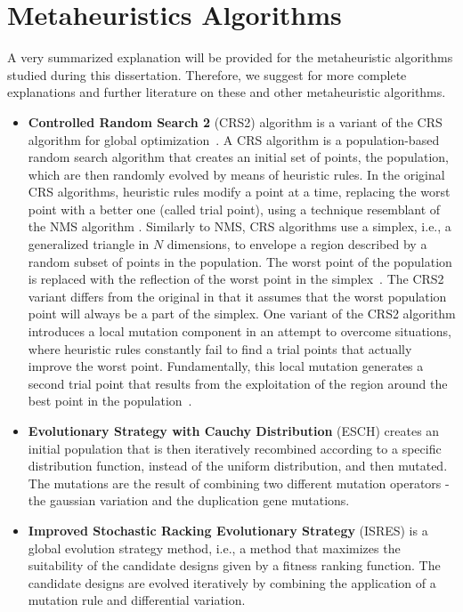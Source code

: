 \section{Metaheuristics Algorithms}

A very summarized explanation will be provided for the metaheuristic algorithms studied during this dissertation. Therefore, we suggest \cite{BlumRoli2003Metaheuristics,Glover2003Metaheuristics} for more complete explanations and further literature on these and other metaheuristic algorithms.

\begin{itemize}
	\item \textbf{Controlled Random Search 2} (CRS2) algorithm is a variant of the CRS algorithm for global optimization~\cite{Price1983}. A CRS algorithm is a population-based random search algorithm that creates an initial set of points, the population, which are then randomly evolved by means of heuristic rules. In the original CRS algorithms, heuristic rules modify a point at a time, replacing the worst point with a better one (called trial point), using a technique resemblant of the NMS algorithm \cite{Nelder1964}. Similarly to NMS, CRS algorithms use a simplex, i.e., a generalized triangle in $N$ dimensions, to envelope a region described by a random subset of points in the population. The worst point of the population is replaced with the reflection of the worst point in the simplex~\cite{Kaelo2006CRS2}. The CRS2 variant differs from the original in that it assumes that the worst population point will always be a part of the simplex. One variant of the CRS2 algorithm introduces a local mutation component in an attempt to overcome situations,  where heuristic rules constantly fail to find a trial points that actually improve the worst point. Fundamentally, this local mutation generates a second trial point that results from the exploitation of the region around the best point in the population~\cite{Kaelo2006CRS2}.  
	
	\item \textbf{Evolutionary Strategy with Cauchy Distribution} (ESCH)  creates an initial population that is then iteratively recombined according to a specific distribution function, instead of the uniform distribution, and then mutated. The mutations are the result of combining two different mutation operators - the gaussian variation and the duplication gene mutations.
	
	\item \textbf{Improved Stochastic Racking Evolutionary Strategy} (ISRES)  is a global evolution strategy method, i.e., a method that maximizes the suitability of the candidate designs given by a fitness ranking function. The candidate designs are evolved iteratively by combining the application of a mutation rule and differential variation.
	

\end{itemize}
